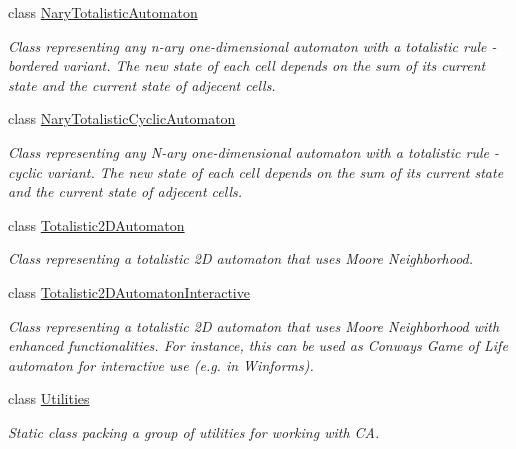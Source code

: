 \begin{DoxyCompactItemize}
class \hyperlink{class_cellular_1_1_nary_totalistic_automaton}{Nary\+Totalistic\+Automaton}
\begin{DoxyCompactList}\small\item\em Class representing any n-\/ary one-\/dimensional automaton with a totalistic rule -\/ bordered variant. The new state of each cell depends on the sum of its current state and the current state of adjecent cells. \end{DoxyCompactList}\item 
class \hyperlink{class_cellular_1_1_nary_totalistic_cyclic_automaton}{Nary\+Totalistic\+Cyclic\+Automaton}
\begin{DoxyCompactList}\small\item\em Class representing any N-\/ary one-\/dimensional automaton with a totalistic rule -\/ cyclic variant. The new state of each cell depends on the sum of its current state and the current state of adjecent cells. \end{DoxyCompactList}\item 
class \hyperlink{class_cellular_1_1_totalistic2_d_automaton}{Totalistic2\+D\+Automaton}
\begin{DoxyCompactList}\small\item\em Class representing a totalistic 2\+D automaton that uses Moore Neighborhood. \end{DoxyCompactList}\item 
class \hyperlink{class_cellular_1_1_totalistic2_d_automaton_interactive}{Totalistic2\+D\+Automaton\+Interactive}
\begin{DoxyCompactList}\small\item\em Class representing a totalistic 2\+D automaton that uses Moore Neighborhood with enhanced functionalities. For instance, this can be used as Conway\textquotesingle{}s Game of Life automaton for interactive use (e.\+g. in Winforms). \end{DoxyCompactList}\item 
class \hyperlink{class_cellular_1_1_utilities}{Utilities}
\begin{DoxyCompactList}\small\item\em Static class packing a group of utilities for working with C\+A. \end{DoxyCompactList}\end{DoxyCompactItemize}
